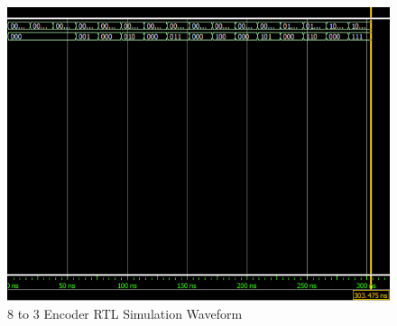 \documentclass[12pt]{article}
\begin{document}
\begin{figure}[H]
\centering
  \includegraphics[scale=0.45]{Images/8to3ENCODER_RTLSIMULATION.png}
  \caption{8 to 3 Encoder RTL Simulation Waveform}
\end{figure}
\end{document}
